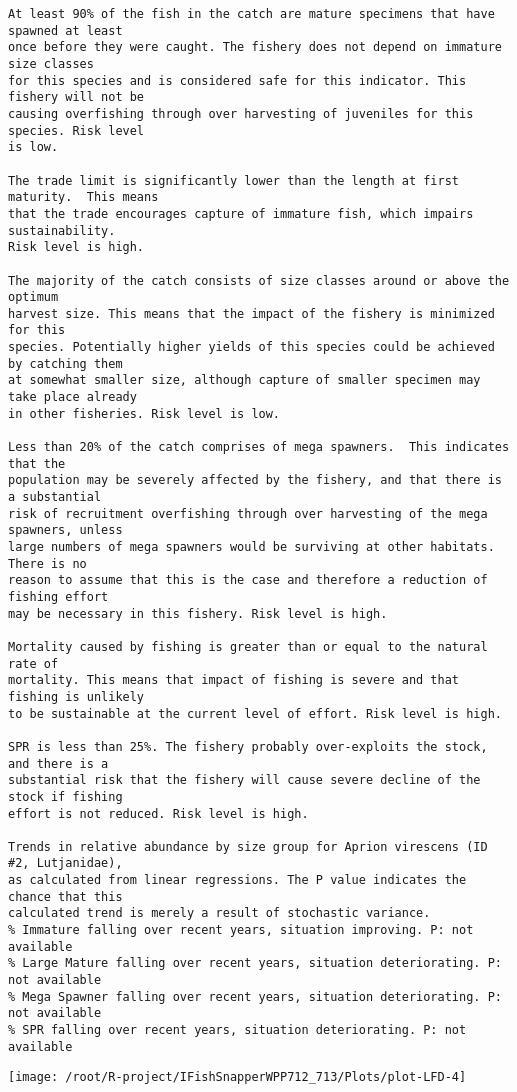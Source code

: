 \documentclass{report}\usepackage[]{graphicx}\usepackage[]{color}
\makeatletter
\def\maxwidth{ %
  \ifdim\Gin@nat@width>\linewidth
    \linewidth
  \else
    \Gin@nat@width
  \fi
}
\newenvironment{kframe}{%
 \def\at@end@of@kframe{}%
 \ifinner\ifhmode%
  \def\at@end@of@kframe{\end{minipage}}%
  \begin{minipage}{\columnwidth}%
 \fi\fi%
 \def\FrameCommand##1{\hskip\@totalleftmargin \hskip-\fboxsep
 \colorbox{shadecolor}{##1}\hskip-\fboxsep
     \hskip-\linewidth \hskip-\@totalleftmargin \hskip\columnwidth}%
 \MakeFramed {\advance\hsize-\width
   \@totalleftmargin\z@ \linewidth\hsize
   \@setminipage}}%
 {\par\unskip\endMakeFramed%
 \at@end@of@kframe}
\newenvironment{knitrout}{}{} %
\makeatother
\begin{document}
\begin{knitrout}
\begin{kframe}
\begin{verbatim}
At least 90% of the fish in the catch are mature specimens that have spawned at least
once before they were caught. The fishery does not depend on immature size classes
for this species and is considered safe for this indicator. This fishery will not be
causing overfishing through over harvesting of juveniles for this species. Risk level
is low.

The trade limit is significantly lower than the length at first maturity.  This means
that the trade encourages capture of immature fish, which impairs sustainability.
Risk level is high.

The majority of the catch consists of size classes around or above the optimum
harvest size. This means that the impact of the fishery is minimized for this
species. Potentially higher yields of this species could be achieved by catching them
at somewhat smaller size, although capture of smaller specimen may take place already
in other fisheries. Risk level is low.

Less than 20% of the catch comprises of mega spawners.  This indicates that the
population may be severely affected by the fishery, and that there is a substantial
risk of recruitment overfishing through over harvesting of the mega spawners, unless
large numbers of mega spawners would be surviving at other habitats. There is no
reason to assume that this is the case and therefore a reduction of fishing effort
may be necessary in this fishery. Risk level is high.
 
Mortality caused by fishing is greater than or equal to the natural rate of
mortality. This means that impact of fishing is severe and that fishing is unlikely
to be sustainable at the current level of effort. Risk level is high.
 
SPR is less than 25%. The fishery probably over-exploits the stock, and there is a
substantial risk that the fishery will cause severe decline of the stock if fishing
effort is not reduced. Risk level is high.
 
Trends in relative abundance by size group for Aprion virescens (ID #2, Lutjanidae),
as calculated from linear regressions. The P value indicates the chance that this
calculated trend is merely a result of stochastic variance.
% Immature falling over recent years, situation improving. P: not available
% Large Mature falling over recent years, situation deteriorating. P: not available
% Mega Spawner falling over recent years, situation deteriorating. P: not available
% SPR falling over recent years, situation deteriorating. P: not available
\end{verbatim}
\end{kframe}
\texttt{[image: /root/R-project/IFishSnapperWPP712\_713/Plots/plot-LFD-4]} 


\end{knitrout}
\end{document}
